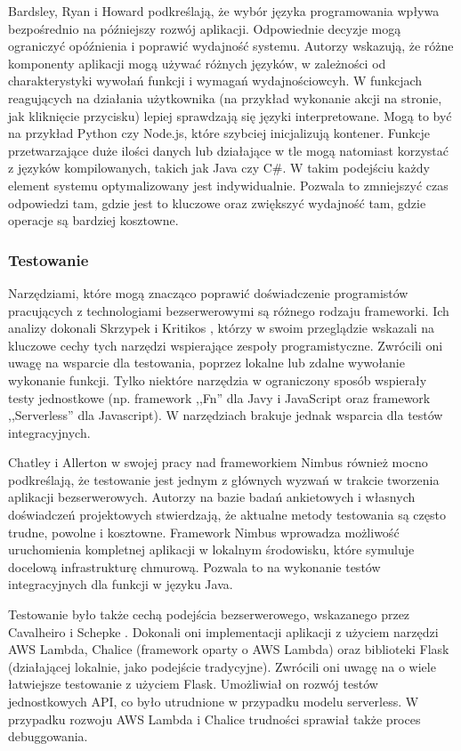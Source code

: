 Bardsley, Ryan i Howard \cite{8513710} podkreślają, że wybór języka programowania wpływa bezpośrednio na późniejszy rozwój aplikacji. 
Odpowiednie decyzje mogą ograniczyć opóźnienia i poprawić wydajność systemu. 
Autorzy wskazują, że różne komponenty aplikacji mogą używać różnych języków, w zależności od charakterystyki wywołań funkcji i wymagań wydajnościowcyh. 
W funkcjach reagujących na działania użytkownika (na przykład wykonanie akcji na stronie, jak kliknięcie przycisku) lepiej sprawdzają się języki interpretowane.
Mogą to być na przykład Python czy Node.js, które szybciej inicjalizują kontener. 
Funkcje przetwarzające duże ilości danych lub działające w tle mogą natomiast korzystać z języków kompilowanych, takich jak Java czy C\#.
W takim podejściu każdy element systemu optymalizowany jest indywidualnie. 
Pozwala to zmniejszyć czas odpowiedzi tam, gdzie jest to kluczowe oraz zwiększyć wydajność tam, gdzie operacje są bardziej kosztowne.

\subsubsection*{Testowanie}

Narzędziami, które mogą znacząco poprawić doświadczenie programistów pracujących z technologiami bezserwerowymi są różnego rodzaju frameworki. 
Ich analizy dokonali Skrzypek i Kritikos \cite{8605774}, którzy w swoim przeglądzie wskazali na kluczowe cechy tych narzędzi wspierające zespoły programistyczne.
Zwrócili oni uwagę na wsparcie dla testowania, poprzez lokalne lub zdalne wywołanie wykonanie funkcji.
Tylko niektóre narzędzia w ograniczony sposób wspierały testy jednostkowe (np. framework ,,Fn'' dla Javy i JavaScript oraz framework ,,Serverless'' dla Javascript).
W narzędziach brakuje jednak wsparcia dla testów integracyjnych.

Chatley i Allerton \cite{10.1145/3377812.3382135} w swojej pracy nad frameworkiem Nimbus również mocno podkreślają, że testowanie jest jednym z głównych wyzwań w trakcie tworzenia aplikacji bezserwerowych.
Autorzy na bazie badań ankietowych i własnych doświadczeń projektowych stwierdzają, że aktualne metody testowania są często trudne, powolne i kosztowne.
Framework Nimbus wprowadza możliwość uruchomienia kompletnej aplikacji w lokalnym środowisku, które symuluje docelową infrastrukturę chmurową.
Pozwala to na wykonanie testów integracyjnych dla funkcji w języku Java.

Testowanie było także cechą podejścia bezserwerowego, wskazanego przez Cavalheiro i Schepke \cite{Cavalheiro202389}.
Dokonali oni implementacji aplikacji z użyciem narzędzi AWS Lambda, Chalice (framework oparty o AWS Lambda) oraz biblioteki Flask (działającej lokalnie, jako podejście tradycyjne).
Zwrócili oni uwagę na o wiele łatwiejsze testowanie z użyciem Flask. 
Umożliwiał on rozwój testów jednostkowych API, co było utrudnione w przypadku modelu serverless.
W przypadku rozwoju AWS Lambda i Chalice trudności sprawiał także proces debuggowania.

